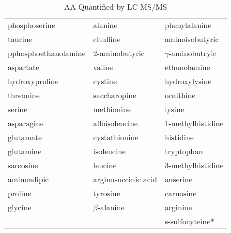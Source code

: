 \documentclass{scrartcl}
\begin{document}
\begin{enumerate}
\begin{table}[htbp]
\caption{\label{tab:org32b859c}
AA Quantified by LC-MS/MS}
\centering
\begin{tabular}{lll}
phosphoserine & alanine & phenylalanine\\
taurine & citulline & aminoisobutyric\\
pphosphoethanolamine & 2-aminobutyric & \(\gamma\)-aminobutryic\\
aspartate & valine & ethanolamine\\
hydroxyproline & cystine & hydroxylysine\\
threonine & saccharopine & ornithine\\
serine & methionine & lysine\\
asparagine & alloisoleucine & 1-methylhistidine\\
glutamate & cystathionine & histidine\\
glutamine & isoleucine & tryptophan\\
sarcosine & leucine & 3-methylhistidine\\
aminoadipic & arginosuccinic acid & anserine\\
proline & tyrosine & carnosine\\
glycine & \(\beta\)-alanine & arginine\\
 &  & s-sulfocyteine*\\
\end{tabular}
\end{table}


\end{enumerate}
\end{document}
